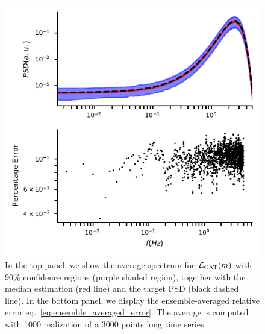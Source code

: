 \documentclass[twocolumn,showpacs,preprintnumbers,nofootinbib,prd,
superscriptaddress,10pt]{revtex4-1}
\begin{document}
\begin{figure}[t]
	\centering
	\includegraphics[width = \linewidth]{Images/optimisers_comparison/normal/CAT_spectrum_estim.pdf}
	\caption{In the top panel, we show the average spectrum for $\mathcal{L}_{\rm CAT}(m)$ with 90\% confidence regions (purple shaded region), together with the median estimation (red line) and the target PSD (black dashed line). In the bottom panel, we display the ensemble-averaged relative error eq.~\eqref{eq:ensemble_averaged_error}. The average is computed with $1000$ realization of a $3000$ points long time series.}
	\label{fig:CATmean}
\end{figure} 
\end{document}
